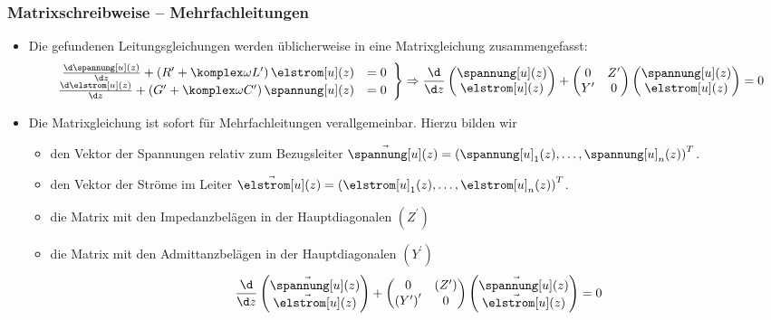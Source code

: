   \begin{frame}
    \frametitle{Matrixschreibweise -- Mehrfachleitungen}
      \begin{itemize}[<+->]
      \item Die gefundenen Leitungsgleichungen werden üblicherweise in eine \alert{Matrixgleichung} zusammengefasst:
        \begin{equation*}
          \left.
    \begin{array}{rl}
      \frac{\d \spannung[u](z)}{\d z} + \left(R^\prime + \komplex\omega L^\prime\right) \elstrom[u](z) &= 0 \\
      \frac{\d \elstrom[u](z)}{\d z} +\left(G^\prime + \komplex\omega C^\prime\right) \spannung[u](z)  &= 0 
    \end{array}\right\} \Rightarrow
  \frac{\d}{\d z}\begin{pmatrix}\spannung[u](z)\\\elstrom[u](z) \end{pmatrix}
  +
  \begin{pmatrix}
    0 & Z^\prime \\
    Y^\prime & 0
  \end{pmatrix}
  \begin{pmatrix}\spannung[u](z)\\\elstrom[u](z) \end{pmatrix} = 0
\end{equation*}
\item Die Matrixgleichung ist sofort für \alert{Mehrfachleitungen} verallgemeinbar. Hierzu bilden wir
  \begin{itemize}[<+->]
    \item den Vektor der Spannungen relativ zum Bezugsleiter \(\vec{\spannung[u]}(z) = \left(\spannung[u]_1(z),\ldots , \spannung[u]_n(z) \right)^T\). 
    \item den Vektor der Ströme im Leiter  \(\vec{\elstrom[u]}(z) = \left(\elstrom[u]_1(z),\ldots , \elstrom[u]_n(z) \right)^T\).
    \item die Matrix mit den Impedanzbelägen in der Hauptdiagonalen \(\left(Z^\prime\right)\) 
    \item die Matrix mit den Admittanzbelägen in der Hauptdiagonalen \(\left(Y^\prime\right)\) 
\begin{equation*}
  \frac{\d}{\d z}\begin{pmatrix}\vec{\spannung[u]}(z)\\\vec{\elstrom[u]}(z) \end{pmatrix}
  +
  \begin{pmatrix}
    0 & \left(Z^\prime\right) \\
    \left(Y^\prime\right)^\prime & 0
  \end{pmatrix}
  \begin{pmatrix}\vec{\spannung[u]}(z)\\\vec{\elstrom[u]}(z) \end{pmatrix} = 0
\end{equation*}

    \end{itemize}
  \end{itemize} 
  \end{frame}

